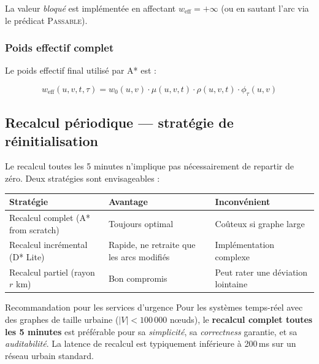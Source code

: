 \documentclass[12pt,a4paper]{article}
\theoremstyle{definition}
\theoremstyle{remark}
\begin{document}
\noindent La valeur \emph{bloqué} est implémentée en affectant
$w_{\text{eff}} = +\infty$ (ou en sautant l'arc via le prédicat
\textsc{Passable}).

\subsubsection{Poids effectif complet}

Le poids effectif final utilisé par A* est :

\begin{equation}
\boxed{
  w_{\text{eff}}(u,v,t,\tau) =
    w_0(u,v) \cdot \mu(u,v,t) \cdot \rho(u,v,t) \cdot \phi_\tau(u,v)
}
\end{equation}

\subsection{Recalcul périodique — stratégie de réinitialisation}

Le recalcul toutes les 5 minutes n'implique pas nécessairement de
repartir de zéro. Deux stratégies sont envisageables :

\begin{center}
\begin{tabular}{lll}
  \toprule
  \textbf{Stratégie} & \textbf{Avantage} & \textbf{Inconvénient} \\
  \midrule
  Recalcul complet (A* from scratch) &
      Toujours optimal & Coûteux si graphe large \\
  Recalcul incrémental (D* Lite) &
      Rapide, ne retraite que les arcs modifiés &
      Implémentation complexe \\
  Recalcul partiel (rayon $r$ km) &
      Bon compromis & Peut rater une déviation lointaine \\
  \bottomrule
\end{tabular}
\end{center}

\begin{metierbox}{Recommandation pour les services d'urgence}
  Pour les systèmes temps-réel avec des graphes de taille urbaine
  ($|V| < 100\,000$ nœuds), le \textbf{recalcul complet toutes les 5
  minutes} est préférable pour sa \emph{simplicité}, sa
  \emph{correctness} garantie, et sa \emph{auditabilité}.
  La latence de recalcul est typiquement inférieure à 200\,ms sur
  un réseau urbain standard.
\end{metierbox}

\newpage
\end{document}
